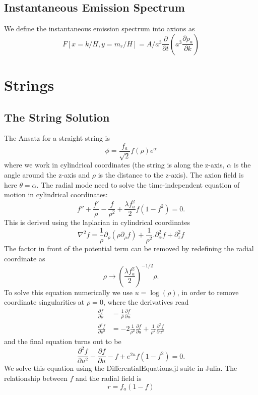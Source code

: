 \documentclass[a4paper]{article}
\begin{document}
\subsection{Instantaneous Emission Spectrum}
We define the instantaneous emission spectrum into axions as
\begin{equation}
    F[x = k / H, y = m_r / H] = A / a^3 \frac{\partial}{\partial t} \left( a^3 \frac{\partial \rho_a}{\partial k} \right)
\end{equation}

\newpage
\section{Strings}


\subsection{The String Solution}

The Ansatz for a straight string is
\begin{equation}
	\phi = \frac{f_a}{\sqrt{2}} f(\rho) e^{\alpha}
\end{equation}
where we work in cylindrical coordinates (the string is along the z-axis, $\alpha$ is the angle around the z-axis and $\rho$ is the distance to the z-axis).
The axion field is here $\theta = \alpha$.
The radial mode need to solve the time-independent equation of motion in cylindrical coordinates:
\begin{equation}
	\label{eq:radial_eq}
	f'' + \frac{f'}{\rho} - \frac{f}{\rho^2} + \frac{\lambda f_a^2}{2} f (1 - f^2) = 0.
\end{equation}
This is derived using the laplacian in cylindrical coordinates 
\begin{equation}
	\nabla^2 f = \frac{1}{\rho} \partial_\rho (\rho \partial_\rho f) + \frac{1}{\rho^2}. \partial_\alpha^2 f + \partial_z^2 f
\end{equation}
The factor in front of the potential term can be removed by redefining the radial coordinate 
as
\begin{equation}
	\rho \to \left( \frac{\lambda f_a^2}{2} \right)^{-1/2} \rho.
\end{equation}
To solve this equation numerically we use $u = \log(\rho)$, in order to remove coordinate singularities at $\rho = 0$, where the derivatives 
read
\begin{align}
	\frac{\partial f}{\partial \rho} &= \frac{1}{\rho} \frac{\partial f}{\partial u} \\
	\frac{\partial^2 f}{\partial \rho^2} &= - 2 \frac{1}{\rho^2} \frac{\partial f}{\partial u}  + \frac{1}{\rho^2} 	\frac{\partial^2 f}{\partial u^2} 
\end{align}
and the final equation turns out to be
\begin{equation}
	\frac{\partial^2 f}{\partial u^2} - \frac{\partial f}{\partial u} - f + e^{2u} f (1 - f^2) = 0.
\end{equation}
We solve this equation using the DifferentialEquations.jl suite in Julia.
The relationship between $f$ and the radial field is
\begin{equation}
	r = f_a (1 - f)
\end{equation}
\end{document}
